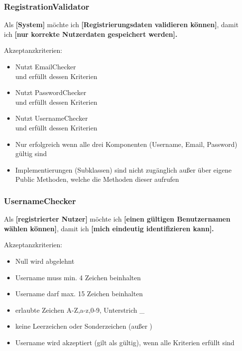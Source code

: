 \subsubsection*{RegistrationValidator}
Als \textbf{[System]} möchte ich \textbf{[Registrierungsdaten validieren können]}, damit ich \textbf{[nur korrekte Nutzerdaten gespeichert werden].}

Akzeptanzkriterien:
\begin{itemize}
    \item Nutzt EmailChecker \\ und erfüllt dessen Kriterien
    \item Nutzt PasswordChecker \\ und erfüllt dessen Kriterien
    \item Nutzt UsernameChecker \\ und erfüllt dessen Kriterien
    \item Nur erfolgreich wenn alle drei Komponenten (Username, Email, Password) gültig sind
    \item Implementierungen (Subklassen) sind nicht zugänglich außer über eigene Public Methoden, welche die Methoden dieser aufrufen
\end{itemize}

\subsubsection*{UsernameChecker}
Als \textbf{[registrierter Nutzer]} möchte ich \textbf{[einen gültigen Benutzernamen wählen können]}, damit ich \textbf{[mich eindeutig identifizieren kann].}

Akzeptanzkriterien:
\begin{itemize}
    \item Null wird abgelehnt
    \item Username muss min. 4 Zeichen beinhalten
    \item Username darf max. 15 Zeichen beinhalten
    \item erlaubte Zeichen A-Z,a-z,0-9, Unterstrich \_
    \item keine Leerzeichen oder Sonderzeichen (außer \gq{\_})
    \item Username wird akzeptiert (gilt als gültig), wenn alle Kriterien erfüllt sind    
\end{itemize}